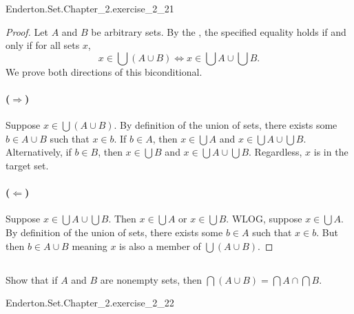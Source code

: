 \documentclass{report}
\begin{document}
    {Enderton.Set.Chapter\_2.exercise\_2\_21}

  \begin{proof}
    Let $A$ and $B$ be arbitrary sets.
    By the , the specified equality holds if
      and only if for all sets $x$,
      $$x \in \bigcup (A \cup B) \iff x \in \bigcup A \cup \bigcup B.$$
    We prove both directions of this biconditional.

    \paragraph{($\Rightarrow$)}%

      Suppose $x \in \bigcup (A \cup B)$.
      By definition of the union of sets, there exists some $b \in A \cup B$
        such that $x \in b$.
      If $b \in A$, then $x \in \bigcup A$ and $x \in \bigcup A \cup \bigcup B$.
      Alternatively, if $b \in B$, then $x \in \bigcup B$ and
        $x \in \bigcup A \cup \bigcup B$.
      Regardless, $x$ is in the target set.

    \paragraph{($\Leftarrow$)}%

      Suppose $x \in \bigcup A \cup \bigcup B$.
      Then $x \in \bigcup A$ or $x \in \bigcup B$.
      WLOG, suppose $x \in \bigcup A$.
      By definition of the union of sets, there exists some $b \in A$ such that
        $x \in b$.
      But then $b \in A \cup B$ meaning $x$ is also a member of
        $\bigcup (A \cup B)$.

  \end{proof}

\subsection{}%

  Show that if $A$ and $B$ are nonempty sets, then
    $\bigcap (A \cup B) = \bigcap A \cap \bigcap B$.

    {Enderton.Set.Chapter\_2.exercise\_2\_22}
\end{document}

